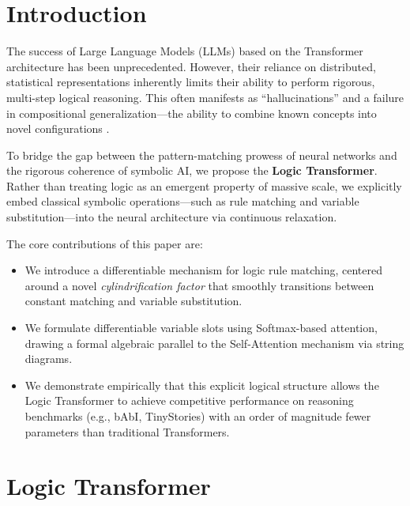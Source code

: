 \documentclass[runningheads]{llncs}
\begin{document}
\section{Introduction}
\label{sec:intro}
The success of Large Language Models (LLMs) based on the Transformer architecture \cite{Vaswani2017} has been unprecedented. However, their reliance on distributed, statistical representations inherently limits their ability to perform rigorous, multi-step logical reasoning. This often manifests as ``hallucinations'' and a failure in compositional generalization—the ability to combine known concepts into novel configurations \cite{Lake2018}.

To bridge the gap between the pattern-matching prowess of neural networks and the rigorous coherence of symbolic AI, we propose the \textbf{Logic Transformer}. Rather than treating logic as an emergent property of massive scale, we explicitly embed classical symbolic operations—such as rule matching and variable substitution—into the neural architecture via continuous relaxation.

The core contributions of this paper are:
\begin{itemize}
	\item We introduce a differentiable mechanism for logic rule matching, centered around a novel \textit{cylindrification factor} that smoothly transitions between constant matching and variable substitution.
	\item We formulate differentiable variable slots using Softmax-based attention, drawing a formal algebraic parallel to the Self-Attention mechanism via string diagrams.
	\item We demonstrate empirically that this explicit logical structure allows the Logic Transformer to achieve competitive performance on reasoning benchmarks (e.g., bAbI, TinyStories) with an order of magnitude fewer parameters than traditional Transformers.
\end{itemize}

\section{Logic Transformer}
\end{document}
